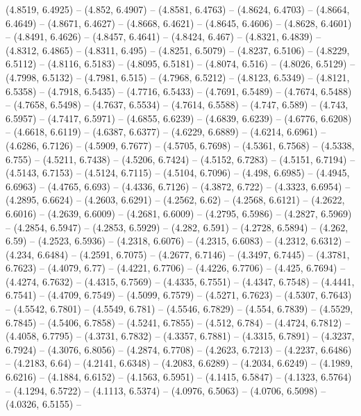 {  (4.8519, 6.4925) -- (4.852, 6.4907) -- (4.8581, 6.4763) -- (4.8624, 6.4703) --
   (4.8664, 6.4649) -- (4.8671, 6.4627) -- (4.8668, 6.4621) -- (4.8645, 6.4606) 
  -- (4.8628, 6.4601) -- (4.8491, 6.4626) -- (4.8457, 6.4641) -- (4.8424, 6.467)
   -- (4.8321, 6.4839) -- (4.8312, 6.4865) -- (4.8311, 6.495) -- (4.8251, 
  6.5079) -- (4.8237, 6.5106) -- (4.8229, 6.5112) -- (4.8116, 6.5183) -- 
  (4.8095, 6.5181) -- (4.8074, 6.516) -- (4.8026, 6.5129) -- (4.7998, 6.5132) --
   (4.7981, 6.515) -- (4.7968, 6.5212) -- (4.8123, 6.5349) -- (4.8121, 6.5358) 
  -- (4.7918, 6.5435) -- (4.7716, 6.5433) -- (4.7691, 6.5489) -- (4.7674, 
  6.5488) -- (4.7658, 6.5498) -- (4.7637, 6.5534) -- (4.7614, 6.5588) -- (4.747,
   6.589) -- (4.743, 6.5957) -- (4.7417, 6.5971) -- (4.6855, 6.6239) -- (4.6839,
   6.6239) -- (4.6776, 6.6208) -- (4.6618, 6.6119) -- (4.6387, 6.6377) -- 
  (4.6229, 6.6889) -- (4.6214, 6.6961) -- (4.6286, 6.7126) -- (4.5909, 6.7677) 
  -- (4.5705, 6.7698) -- (4.5361, 6.7568) -- (4.5338, 6.755) -- (4.5211, 6.7438)
   -- (4.5206, 6.7424) -- (4.5152, 6.7283) -- (4.5151, 6.7194) -- (4.5143, 
  6.7153) -- (4.5124, 6.7115) -- (4.5104, 6.7096) -- (4.498, 6.6985) -- (4.4945,
   6.6963) -- (4.4765, 6.693) -- (4.4336, 6.7126) -- (4.3872, 6.722) -- (4.3323,
   6.6954) -- (4.2895, 6.6624) -- (4.2603, 6.6291) -- (4.2562, 6.62) -- (4.2568,
   6.6121) -- (4.2622, 6.6016) -- (4.2639, 6.6009) -- (4.2681, 6.6009) -- 
  (4.2795, 6.5986) -- (4.2827, 6.5969) -- (4.2854, 6.5947) -- (4.2853, 6.5929) 
  -- (4.282, 6.591) -- (4.2728, 6.5894) -- (4.262, 6.59) -- (4.2523, 6.5936) -- 
  (4.2318, 6.6076) -- (4.2315, 6.6083) -- (4.2312, 6.6312) -- (4.234, 6.6484) --
   (4.2591, 6.7075) -- (4.2677, 6.7146) -- (4.3497, 6.7445) -- (4.3781, 6.7623) 
  -- (4.4079, 6.77) -- (4.4221, 6.7706) -- (4.4226, 6.7706) -- (4.425, 6.7694) 
  -- (4.4274, 6.7632) -- (4.4315, 6.7569) -- (4.4335, 6.7551) -- (4.4347, 
  6.7548) -- (4.4441, 6.7541) -- (4.4709, 6.7549) -- (4.5099, 6.7579) -- 
  (4.5271, 6.7623) -- (4.5307, 6.7643) -- (4.5542, 6.7801) -- (4.5549, 6.781) --
   (4.5546, 6.7829) -- (4.554, 6.7839) -- (4.5529, 6.7845) -- (4.5406, 6.7858) 
  -- (4.5241, 6.7855) -- (4.512, 6.784) -- (4.4724, 6.7812) -- (4.4058, 6.7795) 
  -- (4.3731, 6.7832) -- (4.3357, 6.7881) -- (4.3315, 6.7891) -- (4.3237, 
  6.7924) -- (4.3076, 6.8056) -- (4.2874, 6.7708) -- (4.2623, 6.7213) -- 
  (4.2237, 6.6486) -- (4.2183, 6.64) -- (4.2141, 6.6348) -- (4.2083, 6.6289) -- 
  (4.2034, 6.6249) -- (4.1989, 6.6216) -- (4.1884, 6.6152) -- (4.1563, 6.5951) 
  -- (4.1415, 6.5847) -- (4.1323, 6.5764) -- (4.1294, 6.5722) -- (4.1113, 
  6.5374) -- (4.0976, 6.5063) -- (4.0706, 6.5098) -- (4.0326, 6.5155) -- 
}
